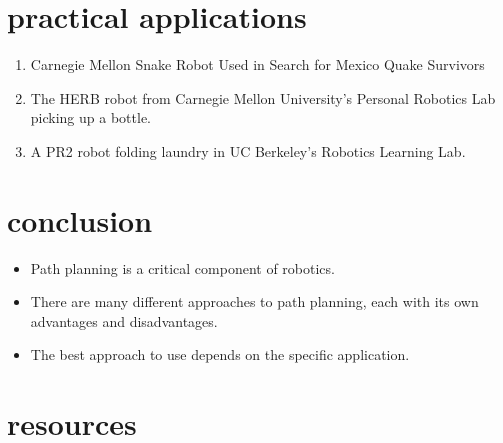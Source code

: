 \documentclass{article}
\begin{document}
\section{practical applications}
\begin{enumerate}
\item Carnegie Mellon Snake Robot Used in Search for Mexico Quake Survivors
\item The HERB robot from Carnegie Mellon University's Personal Robotics Lab picking up a bottle.
\item A PR2 robot folding laundry in UC Berkeley's Robotics Learning Lab. 
\end{enumerate}
\section{conclusion}
\begin{itemize}
\item Path planning is a critical component of robotics.
\item There are many different approaches to path planning, each with its own advantages and disadvantages.
\item The best approach to use depends on the specific application.
\end{itemize}
\section{resources}
\end{document}
